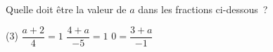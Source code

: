 %
%
Quelle doit être la valeur de \(a\) dans les fractions ci-dessous~?
  \begin{tasks}(3)
    \task $\dfrac{a+2}{4}=1$
    \task $\dfrac{4+a}{-5}=1$
    \task $0=\dfrac{3+a}{-1}$
  \end{tasks}
